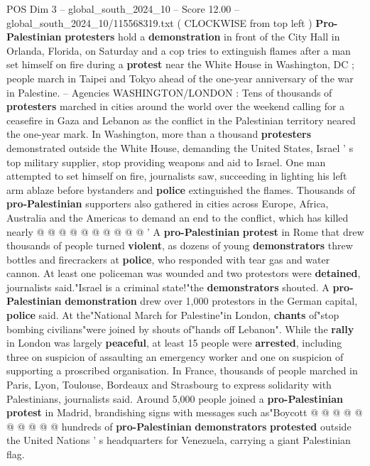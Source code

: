 \begin{textsample}{POS Dim 3 – global\_south\_2024\_10 – Score 12.00 – global\_south\_2024\_10/115568319.txt}  \label{ex:f3_pos_359}
( CLOCKWISE from top left ) \textbf{Pro-Palestinian} \textbf{protesters} hold a \textbf{demonstration} in front of the City Hall in Orlanda, Florida, on Saturday and a cop tries to extinguish flames after a man set himself on fire during a \textbf{protest} near the White House in Washington, DC ; people march in Taipei and Tokyo ahead of the one-year anniversary of the war in Palestine. -- Agencies WASHINGTON/LONDON : Tens of thousands of \textbf{protesters} marched in cities around the world over the weekend calling for a ceasefire in Gaza and Lebanon as the conflict in the Palestinian territory neared the one-year mark.
In Washington, more than a thousand \textbf{protesters} demonstrated outside the White House, demanding the United States, Israel ' s top military supplier, stop providing weapons and aid to Israel.
One man attempted to set himself on fire, journalists saw, succeeding in lighting his left arm ablaze before bystanders and \textbf{police} extinguished the flames.
Thousands of \textbf{pro-Palestinian} supporters also gathered in cities across Europe, Africa, Australia and the Americas to demand an end to the conflict, which has killed nearly @ @ @ @ @ @ @ @ @ @ ' A \textbf{pro-Palestinian} \textbf{protest} in Rome that drew thousands of people turned \textbf{violent}, as dozens of young \textbf{demonstrators} threw bottles and firecrackers at \textbf{police}, who responded with tear gas and water cannon.
At least one policeman was wounded and two protestors were \textbf{detained}, journalists said."Israel is a criminal state!"the \textbf{demonstrators} shouted.
A \textbf{pro-Palestinian} \textbf{demonstration} drew over 1,000 protestors in the German capital, \textbf{police} said.
At the"National March for Palestine"in London, \textbf{chants} of"stop bombing civilians"were joined by shouts of"hands off Lebanon".
While the \textbf{rally} in London was largely \textbf{peaceful}, at least 15 people were \textbf{arrested}, including three on suspicion of assaulting an emergency worker and one on suspicion of supporting a proscribed organisation.
In France, thousands of people marched in Paris, Lyon, Toulouse, Bordeaux and Strasbourg to express solidarity with Palestinians, journalists said.
Around 5,000 people joined a \textbf{pro-Palestinian} \textbf{protest} in Madrid, brandishing signs with messages such as"Boycott @ @ @ @ @ @ @ @ @ @ hundreds of \textbf{pro-Palestinian} \textbf{demonstrators} \textbf{protested} outside the United Nations ' s headquarters for Venezuela, carrying a giant Palestinian flag.

\end{textsample}
